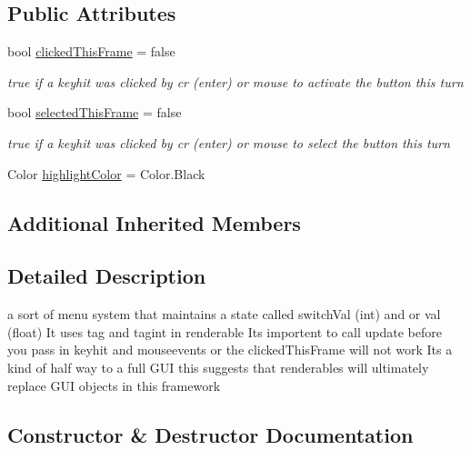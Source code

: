 \subsection*{Public Attributes}
\begin{DoxyCompactItemize}
\item 
bool \mbox{\hyperlink{class_r_c___framework_1_1_r_c___gui_menu_renderable_a400533f5ec57e37197f5b830f4f63ed9}{clicked\+This\+Frame}} = false
\begin{DoxyCompactList}\small\item\em true if a keyhit was clicked by cr (enter) or mouse to activate the button this turn \end{DoxyCompactList}\item 
bool \mbox{\hyperlink{class_r_c___framework_1_1_r_c___gui_menu_renderable_a5092508ec1a58aaef9926a1259bc13e5}{selected\+This\+Frame}} = false
\begin{DoxyCompactList}\small\item\em true if a keyhit was clicked by cr (enter) or mouse to select the button this turn \end{DoxyCompactList}\item 
Color \mbox{\hyperlink{class_r_c___framework_1_1_r_c___gui_menu_renderable_af5e943fb2d0a14e29fa96203743637b9}{highlight\+Color}} = Color.\+Black
\end{DoxyCompactItemize}
\subsection*{Additional Inherited Members}


\subsection{Detailed Description}
a sort of menu system that maintains a state called switch\+Val (int) and or val (float) It uses tag and tagint in renderable Its importent to call update before you pass in keyhit and mouseevents or the clicked\+This\+Frame will not work Its a kind of half way to a full G\+UI this suggests that renderables will ultimately replace G\+UI objects in this framework 



\subsection{Constructor \& Destructor Documentation}
\mbox{\label{class_r_c___framework_1_1_r_c___gui_menu_renderable_a6edd694fec762aa24a713e2b1e567ad0}} 
